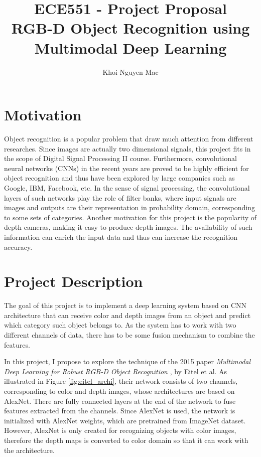\documentclass[11pt,letterpaper]{article}
\author{Khoi-Nguyen Mac}
\title{ECE551 - Project Proposal \\ RGB-D Object Recognition using Multimodal Deep Learning}
\begin{document}
\maketitle
	
\section{Motivation}
Object recognition is a popular problem that draw much attention from different researches. Since images are actually two dimensional signals, this project fits in the scope of Digital Signal Processing II course. Furthermore, convolutional neural networks (CNNs) in the recent years are proved to be highly efficient for object recognition and thus have been explored by large companies such as Google, IBM, Facebook, etc. In the sense of signal processing, the convolutional layers of such networks play the role of filter banks, where input signals are images and outputs are their representation in probability domain, corresponding to some sets of categories. Another motivation for this project is the popularity of depth cameras, making it easy to produce depth images. The availability of such information can enrich the input data and thus can increase the recognition accuracy.

\section{Project Description}
The goal of this project is to implement a deep learning system based on CNN architecture that can receive color and depth images from an object and predict which category such object belongs to. As the system has to work with two different channels of data, there has to be some fusion mechanism to combine the features. 

In this project, I propose to explore the technique of the 2015 paper \textit{Multimodal Deep Learning for Robust RGB-D Object Recognition} \cite{DBLP:journals/corr/EitelSSRB15}, by Eitel et al. As illustrated in Figure \ref{fig:eitel_archi}, their network consists of two channels, corresponding to color and depth images, whose architectures are based on AlexNet. There are fully connected layers at the end of the network to fuse features extracted from the channels. Since AlexNet is used, the network is initialized with AlexNet weights, which are pretrained from ImageNet dataset. However, AlexNet is only created for recognizing objects with color images, therefore the depth maps is converted to color domain so that it can work with the architecture.
\end{document}
